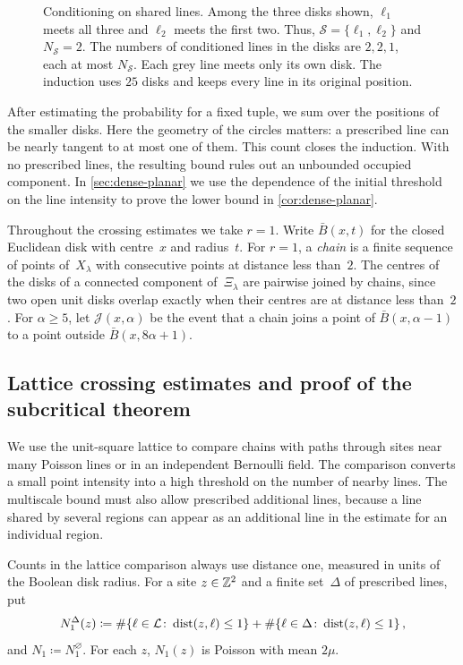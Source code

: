 \documentclass[11pt,letterpaper]{article}
\DeclareMathOperator{\dist}{dist}
\newcommand{\cS}{\mathcal S}
\begin{document}
\begin{figure}[!htbp]
  \centering
  
  \caption{Conditioning on shared lines. Among the three disks shown, $\ell_1$ meets all three and $\ell_2$ meets the first two. Thus, $\cS=\{\ell_1,\ell_2\}$ and $N_{\cS}=2$. The numbers of conditioned lines in the disks are $2,2,1$, each at most $N_{\cS}$. Each grey line meets only its own disk. The induction uses $25$ disks and keeps every line in its original position.}
  \label{fig:shared-line}
\end{figure}

After estimating the probability for a fixed tuple, we sum over the positions of the smaller disks. Here the geometry of the circles matters: a prescribed line can be nearly tangent to at most one of them. This count closes the induction. With no prescribed lines, the resulting bound rules out an unbounded occupied component. In \cref{sec:dense-planar} we use the dependence of the initial threshold on the line intensity to prove the lower bound in \cref{cor:dense-planar}.

Throughout the crossing estimates we take $r=1$. Write $\bar B(x,t)$ for the closed Euclidean disk with centre~$x$ and radius~$t$. For $r=1$, a \emph{chain} is a finite sequence of points of~$X_\lambda$ with consecutive points at distance less than~$2$. The centres of the disks of a connected component of~$\Xi_\lambda$ are pairwise joined by chains, since two open unit disks overlap exactly when their centres are at distance less than~$2$. For $\alpha\ge5$, let $\mathcal J(x,\alpha)$ be the event that a chain joins a point of $\bar B(x,\alpha-1)$ to a point outside $\bar B(x,8\alpha+1)$.

\subsection{Lattice crossing estimates and proof of the subcritical theorem}
\label{sub:sec:setting}

We use the unit-square lattice to compare chains with paths through sites near many Poisson lines or in an independent Bernoulli field. The comparison converts a small point intensity into a high threshold on the number of nearby lines. The multiscale bound must also allow prescribed additional lines, because a line shared by several regions can appear as an additional line in the estimate for an individual region.

Counts in the lattice comparison always use distance one, measured in units of the Boolean disk radius. For a site $z\in\mathbb Z^2$ and a finite set~$\Delta$ of prescribed lines, put
\begin{equation*}
  N_1^{\Delta}(z)\coloneqq\#\{\ell\in\cL\colon\dist(z,\ell)\le 1\}+\#\{\ell\in\Delta\colon\dist(z,\ell)\le 1\}\,,
\end{equation*}
and $N_1\coloneqq N_1^\varnothing$. For each $z$, $N_1(z)$ is Poisson with mean $2\mu$.
\end{document}

